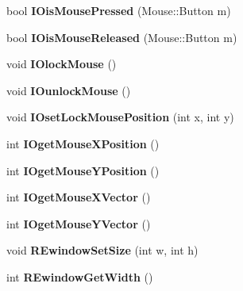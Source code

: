 \begin{DoxyCompactItemize}
\item 
\hypertarget{class_i_s_e_a0e5cfd21f7f37d2cfc1c0ccad6ce5e12}{bool {\bfseries I\-Ois\-Mouse\-Pressed} (Mouse\-::\-Button m)}\label{class_i_s_e_a0e5cfd21f7f37d2cfc1c0ccad6ce5e12}

\item 
\hypertarget{class_i_s_e_a50ecdecf1809907d1f2dccae7d85c3e5}{bool {\bfseries I\-Ois\-Mouse\-Released} (Mouse\-::\-Button m)}\label{class_i_s_e_a50ecdecf1809907d1f2dccae7d85c3e5}

\item 
\hypertarget{class_i_s_e_af5cdbfd74c5da50ad53ac90618b6bfbe}{void {\bfseries I\-Olock\-Mouse} ()}\label{class_i_s_e_af5cdbfd74c5da50ad53ac90618b6bfbe}

\item 
\hypertarget{class_i_s_e_a1fa48a4c97ca6b3ff2eac4bbc674e106}{void {\bfseries I\-Ounlock\-Mouse} ()}\label{class_i_s_e_a1fa48a4c97ca6b3ff2eac4bbc674e106}

\item 
\hypertarget{class_i_s_e_ac476e53b1c7fb6ef168fc5de0eb89988}{void {\bfseries I\-Oset\-Lock\-Mouse\-Position} (int x, int y)}\label{class_i_s_e_ac476e53b1c7fb6ef168fc5de0eb89988}

\item 
\hypertarget{class_i_s_e_a74fd5406b106ec927470bc7329abe38e}{int {\bfseries I\-Oget\-Mouse\-X\-Position} ()}\label{class_i_s_e_a74fd5406b106ec927470bc7329abe38e}

\item 
\hypertarget{class_i_s_e_a0f9c9a2f79bb7d8773debf78d2cdbbc1}{int {\bfseries I\-Oget\-Mouse\-Y\-Position} ()}\label{class_i_s_e_a0f9c9a2f79bb7d8773debf78d2cdbbc1}

\item 
\hypertarget{class_i_s_e_a1b076037e55f2426dab4ce3145ca17f6}{int {\bfseries I\-Oget\-Mouse\-X\-Vector} ()}\label{class_i_s_e_a1b076037e55f2426dab4ce3145ca17f6}

\item 
\hypertarget{class_i_s_e_a1a81ea6d316cff89168c518005c09037}{int {\bfseries I\-Oget\-Mouse\-Y\-Vector} ()}\label{class_i_s_e_a1a81ea6d316cff89168c518005c09037}

\item 
\hypertarget{class_i_s_e_a6a5e83f6e8e6204a9bc0812c3b0b2940}{void {\bfseries R\-Ewindow\-Set\-Size} (int w, int h)}\label{class_i_s_e_a6a5e83f6e8e6204a9bc0812c3b0b2940}

\item 
\hypertarget{class_i_s_e_adf082603197ef3c9252c03c16ec31cae}{int {\bfseries R\-Ewindow\-Get\-Width} ()}\label{class_i_s_e_adf082603197ef3c9252c03c16ec31cae}


\end{DoxyCompactItemize}

